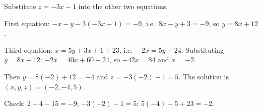 Substitute $z=-3x-1$ into the other two equations.

First equation: $-x-y-3(-3x-1)=-9$, i.e.\ $8x-y+3=-9$, so $y=8x+12$.

Third equation: $x=5y+3x+1+23$, i.e.\ $-2x=5y+24$. Substituting $y=8x+12$: $-2x=40x+60+24$, so $-42x=84$ and $x=-2$.

Then $y=8(-2)+12=-4$ and $z=-3(-2)-1=5$. The solution is $\boxed{(x,y,z)=(-2,-4,5)}$.

Check: $2+4-15=-9$; $-3(-2)-1=5$; $5(-4)-5+23=-2$.
